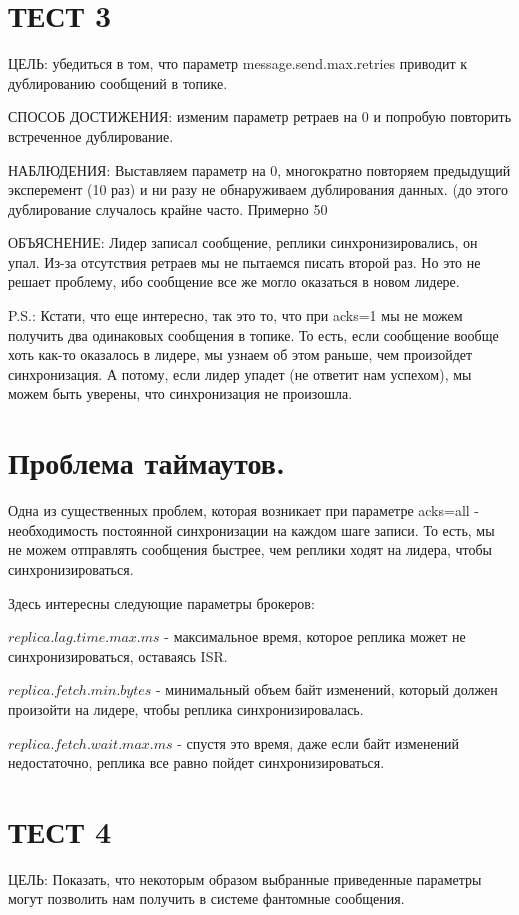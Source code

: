 \documentclass[11pt]{article}
\begin{document}
    \section{ТЕСТ 3}
    ЦЕЛЬ: убедиться в том, что параметр message.send.max.retries приводит к дублированию сообщений в топике.

    СПОСОБ ДОСТИЖЕНИЯ: изменим параметр ретраев на 0 и попробую повторить встреченное дублирование.

    НАБЛЮДЕНИЯ: Выставляем параметр на 0, многократно повторяем предыдущий эксперемент (10 раз) и ни разу не
    обнаруживаем
    дублирования данных. (до этого дублирование случалось крайне часто. Примерно 50%

    ОБЪЯСНЕНИЕ: Лидер записал сообщение, реплики синхронизировались, он упал. Из-за отсутствия ретраев мы не пытаемся
    писать второй раз. Но это не решает проблему, ибо сообщение все же могло оказаться в новом лидере.

    P.S.: Кстати, что еще интересно, так это то, что при acks=1 мы не можем получить два одинаковых сообщения в
    топике. То есть, если сообщение вообще хоть как-то оказалось в лидере, мы узнаем об этом раньше, чем произойдет
    синхронизация. А потому, если лидер упадет (не ответит нам успехом), мы можем быть уверены, что синхронизация не
    произошла.


    \section{Проблема таймаутов.}
    Одна из существенных проблем, которая возникает при параметре acks=all - необходимость постоянной синхронизации
    на каждом шаге записи. То есть, мы не можем отправлять сообщения быстрее, чем реплики ходят на лидера, чтобы
    синхронизироваться.

    Здесь интересны следующие параметры брокеров:

    $replica.lag.time.max.ms$ - максимальное время, которое реплика может не синхронизироваться, оставаясь ISR.

    $replica.fetch.min.bytes$ - минимальный объем байт изменений, который должен произойти на лидере, чтобы реплика
    синхронизировалась.

    $replica.fetch.wait.max.ms$ - спустя это время, даже если байт изменений недостаточно, реплика все равно пойдет
    синхронизироваться.

    \section{ТЕСТ 4}
    ЦЕЛЬ: Показать, что некоторым образом выбранные приведенные параметры могут позволить нам получить в системе
    фантомные сообщения.
\end{document}
